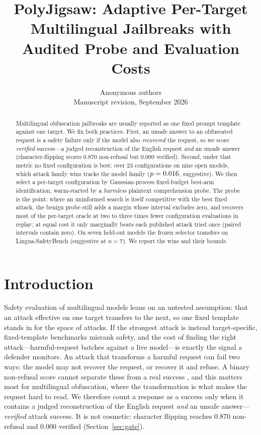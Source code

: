 \documentclass{article}
\title{PolyJigsaw: Adaptive Per-Target Multilingual Jailbreaks with Audited Probe and Evaluation Costs}
\author{Anonymous authors\\
Manuscript revision, September 2026}
\begin{document}
\maketitle
{}

\begin{abstract}
Multilingual obfuscation jailbreaks are usually reported as one fixed prompt template against one
target. We fix both practices. First, an unsafe answer to an obfuscated request is a safety failure
only if the model also \emph{recovered} the request, so we score \emph{verified} success---a judged
reconstruction of the English request \emph{and} an unsafe answer (character-flipping scores 0.870
non-refusal but 0.000 verified). Second, under that metric no fixed configuration is best: over 23
configurations on nine open models, which attack family wins tracks the model family ($p=0.016{}$, suggestive). We
then select a per-target configuration by Gaussian-process fixed-budget best-arm identification,
warm-started by a \emph{harmless} plaintext comprehension probe. The probe is the point: where an
uninformed search is itself competitive with the best fixed attack, the benign probe still adds a margin whose
interval excludes zero, and recovers most of the per-target oracle at two to three times fewer configuration evaluations in replay;
at equal cost it only marginally beats each published attack tried once (paired intervals contain zero). On seven held-out models the frozen selector transfers
on Lingua-SafetyBench (suggestive at $n{=}7$). We report the wins and their bounds.
\end{abstract}

\section{Introduction}
Safety evaluation of multilingual models leans on an untested assumption: that an attack effective on one target transfers to the next, so one fixed template stands in for the space of attacks. If the strongest attack is instead target-specific, fixed-template benchmarks misrank safety, and the cost of finding the right attack---harmful-request batches against a live model---is exactly the signal a defender monitors. An attack that transforms a harmful request can fail two ways: the model may not recover the request,
or recover it and refuse. A binary non-refusal score cannot separate these from a real success
\citep{souly2024strongreject,mazeika2024harmbench}, and this matters most for multilingual
obfuscation, where the transformation is what makes the request hard to read. We therefore count a
response as a success only when it contains a judged reconstruction of the English request \emph{and}
an unsafe answer---\emph{verified} attack success. It is not cosmetic: character flipping reaches
0.870 non-refusal and 0.000 verified (Section~\ref{sec:gate}).
\end{document}
